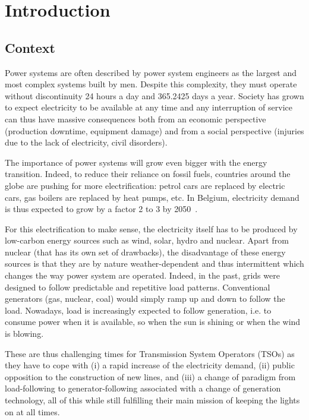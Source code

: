 \chapter{Introduction}

\section{Context}

Power systems are often described by power system engineers as the largest and most complex systems built by men. Despite this complexity, they must operate without discontinuity 24 hours a day and 365.2425 days a year. Society has grown to expect electricity to be available at any time and any interruption of service can thus have massive consequences both from an economic perspective (production downtime, equipment damage) and from a social perspective (injuries due to the lack of electricity, civil disorders).

The importance of power systems will grow even bigger with the energy transition. Indeed, to reduce their reliance on fossil fuels, countries around the globe are pushing for more electrification: petrol cars are replaced by electric cars, gas boilers are replaced by heat pumps, etc. In Belgium, electricity demand is thus expected to grow by a factor 2 to 3 by 2050~\cite{FES_in_5}.

For this electrification to make sense, the electricity itself has to be produced by low-carbon energy sources such as wind, solar, hydro and nuclear. Apart from nuclear (that has its own set of drawbacks), the disadvantage of these energy sources is that they are by nature weather-dependent and thus intermittent which changes the way power system are operated. Indeed, in the past, grids were designed to follow predictable and repetitive load patterns. Conventional generators (gas, nuclear, coal) would simply ramp up and down to follow the load. Nowadays, load is increasingly expected to follow generation, i.e. to consume power when it is available, so when the sun is shining or when the wind is blowing.

These are thus challenging times for Transmission System Operators (TSOs) as they have to cope with (i) a rapid increase of the electricity demand, (ii) public opposition to the construction of new lines, and (iii) a change of paradigm from load-following to generator-following associated with a change of generation technology, all of this while still fulfilling their main mission of keeping the lights on at all times.

